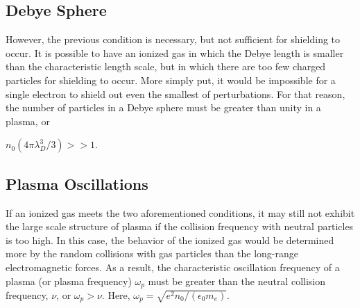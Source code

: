 \subsection{Debye Sphere}
However, the previous condition is necessary, but not sufficient for shielding
to occur. It is possible to have an ionized gas in which the Debye length is
smaller than the characteristic length scale, but in which there are too few
charged particles for shielding to occur. More simply put, it would be
impossible for a single electron to shield out even the smallest of
perturbations. For that reason, the number of particles in a Debye sphere must
be greater than unity in a plasma, or {$n_0(4\pi \lambda_D^3/3) >> 1$.

\subsection{Plasma Oscillations}
If an ionized gas meets the two aforementioned conditions, it may still not
exhibit the large scale structure of plasma if the collision frequency with
neutral particles is too high. In this case, the behavior of the ionized gas
would be determined more by the random collisions with gas particles than the
long-range electromagnetic forces. As a result, the characteristic oscillation
frequency of a plasma (or plasma frequency) $\omega_p$ must be greater than the
neutral collision frequency, $\nu$, or {$\omega_p > \nu$}. Here, $\omega_p =
\sqrt{e^2n_0/(\epsilon_0 m_e)}$.

}

